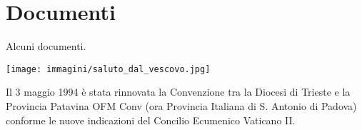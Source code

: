 \chapter{Documenti}
\label{chap:Documenti}
Alcuni documenti.





\newpage
\begin{center}
\texttt{[image: immagini/saluto\_dal\_vescovo.jpg]}%
\end{center}
\newpage

Il 3 maggio 1994 è stata rinnovata la Convenzione tra la Diocesi di Trieste e la Provincia Patavina OFM Conv (ora Provincia Italiana di S. Antonio di Padova) conforme le nuove indicazioni del Concilio Ecumenico Vaticano II.